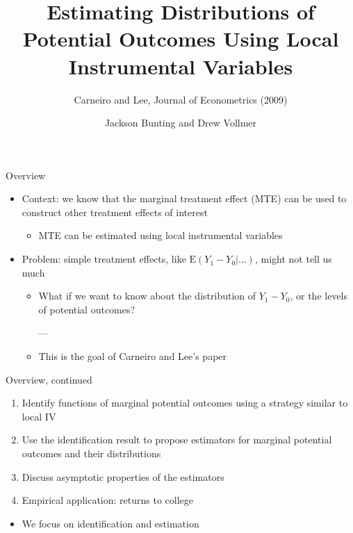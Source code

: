 \documentclass{beamer}
\newcommand{\E}{\mathrm{E}} %
\begin{document}
\title[Distributions of Potential Outcomes]{Estimating Distributions
  of Potential Outcomes Using Local Instrumental Variables}
\subtitle{Carneiro and Lee, Journal of Econometrics (2009)}
\author[]{Jackson Bunting and Drew Vollmer}
\frame{\maketitle}


\begin{frame}{Overview}

\begin{itemize}

\item Context: we know that the marginal treatment effect (MTE) can be
  used to construct other treatment effects of interest
\begin{itemize}
\item MTE can be estimated using local instrumental variables
\end{itemize}

\pause

\item Problem: simple treatment effects, like $\E(Y_1 - Y_0 | \dots)$,
  might not tell us much
\begin{itemize}
\item What if we want to know about the distribution of $Y_1 - Y_0$,
  or the levels of potential outcomes?

---\pause

\item This is the goal of Carneiro and Lee's paper
\end{itemize}

\end{itemize}

\end{frame}


\begin{frame}{Overview, continued}

\begin{enumerate}

\item Identify functions of marginal potential outcomes using a
  strategy similar to local IV

\item Use the identification result to propose estimators for marginal
  potential outcomes and their distributions

\item Discuss asymptotic properties of the estimators

\item Empirical application: returns to college

\end{enumerate}

\pause

\begin{itemize}
\item We focus on identification and estimation
\end{itemize}

\end{frame}
\end{document}
